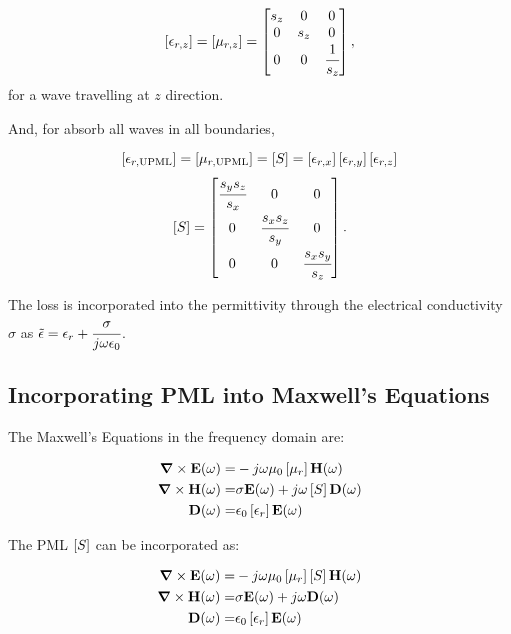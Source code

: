 \begin{equation}
    \brackets{\epsilon_{r,z}} = \brackets{\mu_{r,z}} = \begin{bmatrix}
        s_z & 0 & 0 \\
        0 & s_z & 0 \\
        0 & 0 & \cfrac{1}{s_z}
    \end{bmatrix},
\end{equation}
for a wave travelling at $z$ direction.

And, for absorb all waves in all boundaries,

\begin{equation}
    \brackets{\epsilon_{r,\textnormal{UPML}}} = \brackets{\mu_{r,\textnormal{UPML}}} = \brackets{S} = \brackets{\epsilon_{r,x}}\brackets{\epsilon_{r,y}}\brackets{\epsilon_{r,z}} \nonumber
\end{equation} 
\begin{equation}
    \brackets{S} = \begin{bmatrix}
        \cfrac{s_ys_z}{s_x} & 0 & 0 \\
        0 & \cfrac{s_xs_z}{s_y} & 0 \\
        0 & 0 & \cfrac{s_xs_y}{s_z}
    \end{bmatrix}.
\end{equation}

The loss is incorporated into the permittivity through the electrical conductivity $\sigma$ as $\tilde{\epsilon} = \epsilon_r + \cfrac{\sigma}{j\omega \epsilon_0}$.

\subsection{Incorporating PML into Maxwell's Equations}

The Maxwell's Equations in the frequency domain are:

\begin{eqnarray}
    \rot \E (\omega) =& -j\omega \mu_0 \brackets{\mu_r} \Hh (\omega) \\
    \rot \Hh (\omega) =& \sigma \E(\omega) + j\omega\brackets{S} \D (\omega) \\
    \D (\omega) =& \epsilon_0 \brackets{\epsilon _r}\E (\omega)
\end{eqnarray}

The PML $\brackets{S}$ can be incorporated as:

\begin{eqnarray}
    \rot \E (\omega) =& -j\omega \mu_0 \brackets{\mu_r} \brackets{S} \Hh (\omega) \\
    \rot \Hh (\omega) =& \sigma \E(\omega) + j\omega \D (\omega) \\
    \D (\omega) =& \epsilon_0 \brackets{\epsilon _r} \E (\omega)
\end{eqnarray}

